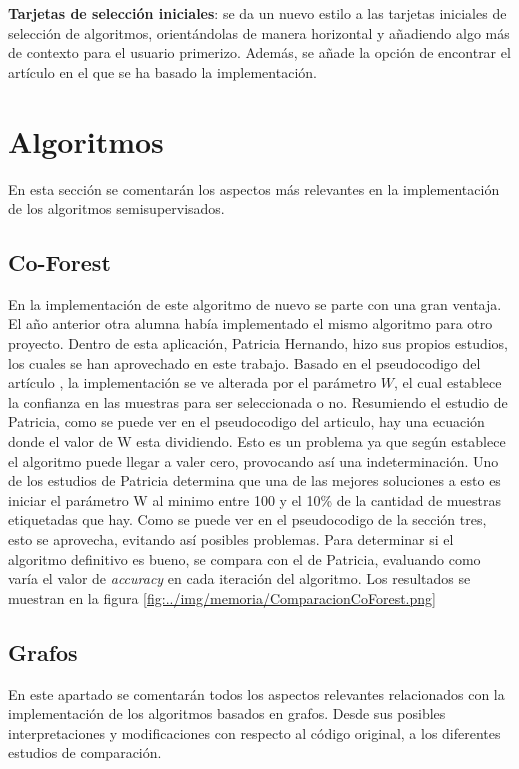 \textbf{Tarjetas de selección iniciales}: se da un nuevo estilo a las tarjetas iniciales de selección de algoritmos, orientándolas de manera horizontal y añadiendo algo más de contexto para el usuario primerizo. Además, se añade la opción de encontrar el artículo en el que se ha basado la implementación.
\section{Algoritmos}
En esta sección se comentarán los aspectos más relevantes en la implementación de los algoritmos semisupervisados.
\subsection{Co-Forest}\label{sec5:coforest}
En la implementación de este algoritmo de nuevo se parte con una gran ventaja. El año anterior otra alumna había implementado el mismo algoritmo para otro proyecto. Dentro de esta aplicación, Patricia Hernando, hizo sus propios estudios, los cuales se han aprovechado en este trabajo.
Basado en el pseudocodigo del artículo \cite{IEEE:CoForest}, la implementación se ve alterada por el parámetro $W$, el cual establece la confianza en las muestras para ser seleccionada o no. Resumiendo el estudio de Patricia, como se puede ver en el pseudocodigo del articulo, hay una ecuación donde el valor de W esta dividiendo. Esto es un problema ya que según establece el algoritmo puede llegar a valer cero, provocando así una indeterminación. Uno de los estudios de Patricia determina que una de las mejores soluciones a esto es iniciar el parámetro W al minimo entre 100 y el 10\% de la cantidad de muestras etiquetadas que hay. Como se puede ver en el pseudocodigo de la sección tres, esto se aprovecha, evitando así posibles problemas.
Para determinar si el algoritmo definitivo es bueno, se compara con el de Patricia, evaluando como varía el valor de \textit{accuracy} en cada iteración del algoritmo. Los resultados se muestran en la figura \ref{fig:../img/memoria/ComparacionCoForest.png}

\subsection{Grafos}
En este apartado se comentarán todos los aspectos relevantes relacionados con la implementación de los algoritmos basados en grafos. Desde sus posibles interpretaciones y modificaciones con respecto al código original, a los diferentes estudios de comparación.

